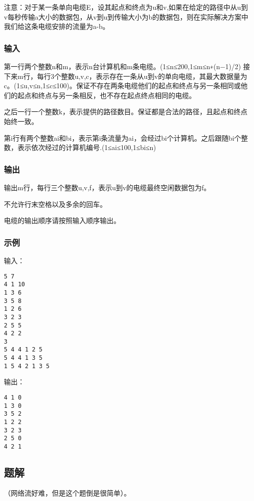 注意：对于某一条单向电缆E，设其起点和终点为u和v,如果在给定的路径中从u到v每秒传输a大小的数据包，从v到u到传输大小为b的数据包，则在实际解决方案中我们给这条电缆安排的流量为a-b。

\subsubsection{输入}
第一行两个整数n和m，表示n台计算机和m条电缆。(1≤n≤200,1≤m≤n∗(n−1)/2)
接下来m行，每行3个整数u,v,c，表示存在一条从u到v的单向电缆，其最大数据量为c。(1≤u,v≤n,1≤c≤100)。保证不存在两条电缆他们的起点和终点与另一条相同或他们的起点和终点与另一条相反，也不存在起点终点相同的电缆。

之后一行一个整数k，表示提供的路径数目。保证都是合法的路径，且起点和终点始终一致。

第i行有两个整数ai和bi，表示第i条流量为ai，会经过bi个计算机。之后跟随bi个整数，表示依次经过的计算机编号.(1≤ai≤100,1≤bi≤n)

\subsubsection{输出}
输出m行，每行三个整数u,v,f，表示u到v的电缆最终空闲数据包为f。

不允许行末空格以及多余的回车。

电缆的输出顺序请按照输入顺序输出。

\subsubsection{示例}
输入：
\begin{lstlisting}
5 7
4 1 10
1 3 6
3 5 8
1 2 6
3 2 3
2 5 5
4 2 2
3
5 4 4 1 2 5
5 4 4 1 3 5
1 5 4 2 1 3 5
\end{lstlisting}

输出：
\begin{lstlisting}
4 1 0
1 3 0
3 5 2
1 2 2
3 2 3
2 5 0
4 2 1
\end{lstlisting}

\subsection{题解}
（网络流好难，但是这个题倒是很简单）。

